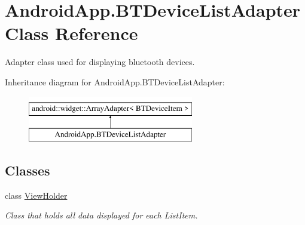 \hypertarget{class_android_app_1_1_b_t_device_list_adapter}{}\section{Android\+App.\+B\+T\+Device\+List\+Adapter Class Reference}
\label{class_android_app_1_1_b_t_device_list_adapter}


Adapter class used for displaying bluetooth devices.  


Inheritance diagram for Android\+App.\+B\+T\+Device\+List\+Adapter\+:\begin{figure}[H]
\begin{center}
\leavevmode
\includegraphics[height=2.000000cm]{class_android_app_1_1_b_t_device_list_adapter}
\end{center}
\end{figure}
\subsection*{Classes}
\begin{DoxyCompactItemize}
\item 
class \hyperlink{class_android_app_1_1_b_t_device_list_adapter_1_1_view_holder}{View\+Holder}
\begin{DoxyCompactList}\small\item\em Class that holds all data displayed for each List\+Item. \end{DoxyCompactList}\end{DoxyCompactItemize}

